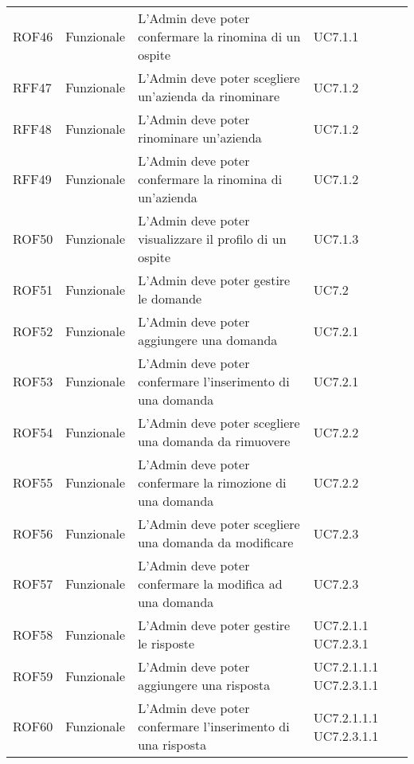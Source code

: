 \documentclass[../AnalisiDeiRequisiti_v3.0.0.tex]{subfiles}
\begin{document}
\begin{longtable}{p{2.5cm}!{\VRule[1pt]}p{2.5cm}!{\VRule[1pt]}p{5cm}!{\VRule[1pt]}p{2.5cm}}
	ROF46&Funzionale\newline  & L'Admin deve poter confermare la rinomina di un ospite & UC7.1.1 \\
	RFF47&Funzionale\newline  & L'Admin deve poter scegliere un'azienda da rinominare & UC7.1.2 \\
	RFF48&Funzionale\newline  & L'Admin deve poter rinominare un'azienda & UC7.1.2 \\
	RFF49&Funzionale\newline  & L'Admin deve poter confermare la rinomina di un'azienda & UC7.1.2 \\
	ROF50&Funzionale\newline  & L'Admin deve poter visualizzare il profilo di un ospite & UC7.1.3 \\
	ROF51&Funzionale\newline  & L'Admin deve poter gestire le domande & UC7.2 \\
	ROF52&Funzionale\newline  & L'Admin deve poter aggiungere una domanda & UC7.2.1 \\
	ROF53&Funzionale\newline  & L'Admin deve poter confermare l'inserimento di una domanda & UC7.2.1 \\
	ROF54&Funzionale\newline  & L'Admin deve poter scegliere una domanda da rimuovere & UC7.2.2 \\
	ROF55&Funzionale\newline  & L'Admin deve poter confermare la rimozione di una domanda & UC7.2.2 \\
	ROF56&Funzionale\newline  & L'Admin deve poter scegliere una domanda da modificare & UC7.2.3 \\
	ROF57&Funzionale\newline  & L'Admin deve poter confermare la modifica ad una domanda & UC7.2.3 \\
	ROF58&Funzionale\newline  & L'Admin deve poter gestire le risposte & UC7.2.1.1 UC7.2.3.1 \\
	ROF59&Funzionale\newline  & L'Admin deve poter aggiungere una risposta & UC7.2.1.1.1 UC7.2.3.1.1 \\
	ROF60&Funzionale\newline  & L'Admin deve poter confermare l'inserimento di una risposta & UC7.2.1.1.1 UC7.2.3.1.1 \\

\end{longtable}
\end{document}
